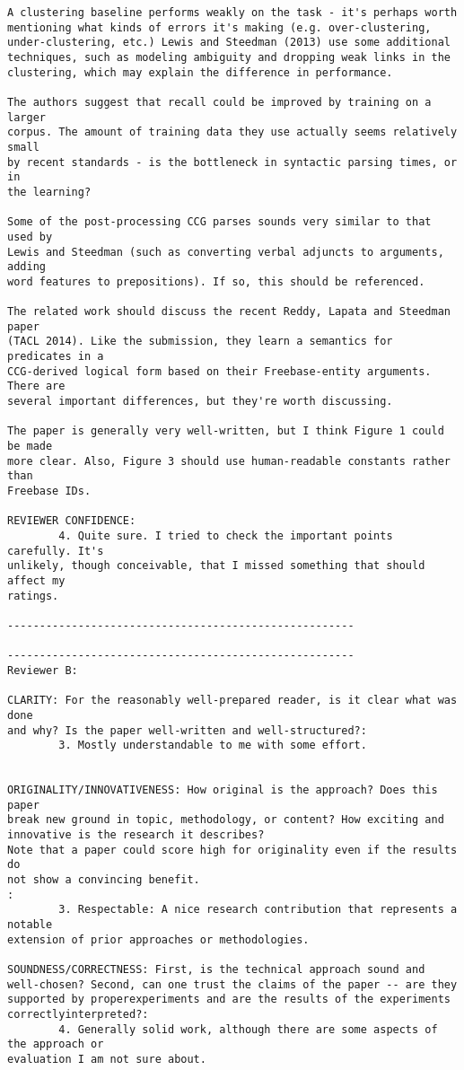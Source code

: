 \documentclass{article}[11pt,oneside]
\begin{document}
\begin{verbatim}
A clustering baseline performs weakly on the task - it's perhaps worth
mentioning what kinds of errors it's making (e.g. over-clustering,
under-clustering, etc.) Lewis and Steedman (2013) use some additional
techniques, such as modeling ambiguity and dropping weak links in the
clustering, which may explain the difference in performance.

The authors suggest that recall could be improved by training on a larger
corpus. The amount of training data they use actually seems relatively small
by recent standards - is the bottleneck in syntactic parsing times, or in
the learning?

Some of the post-processing CCG parses sounds very similar to that used by
Lewis and Steedman (such as converting verbal adjuncts to arguments, adding
word features to prepositions). If so, this should be referenced.

The related work should discuss the recent Reddy, Lapata and Steedman paper
(TACL 2014). Like the submission, they learn a semantics for predicates in a
CCG-derived logical form based on their Freebase-entity arguments. There are
several important differences, but they're worth discussing.

The paper is generally very well-written, but I think Figure 1 could be made
more clear. Also, Figure 3 should use human-readable constants rather than
Freebase IDs.

REVIEWER CONFIDENCE:
        4. Quite sure. I tried to check the important points carefully. It's
unlikely, though conceivable, that I missed something that should affect my
ratings.

------------------------------------------------------

------------------------------------------------------
Reviewer B:

CLARITY: For the reasonably well-prepared reader, is it clear what was done
and why? Is the paper well-written and well-structured?:
        3. Mostly understandable to me with some effort.


ORIGINALITY/INNOVATIVENESS: How original is the approach? Does this paper
break new ground in topic, methodology, or content? How exciting and
innovative is the research it describes?
Note that a paper could score high for originality even if the results do
not show a convincing benefit.
:
        3. Respectable: A nice research contribution that represents a notable
extension of prior approaches or methodologies.

SOUNDNESS/CORRECTNESS: First, is the technical approach sound and
well-chosen? Second, can one trust the claims of the paper -- are they
supported by properexperiments and are the results of the experiments
correctlyinterpreted?:
        4. Generally solid work, although there are some aspects of the approach or
evaluation I am not sure about.


\end{verbatim}
\end{document}
